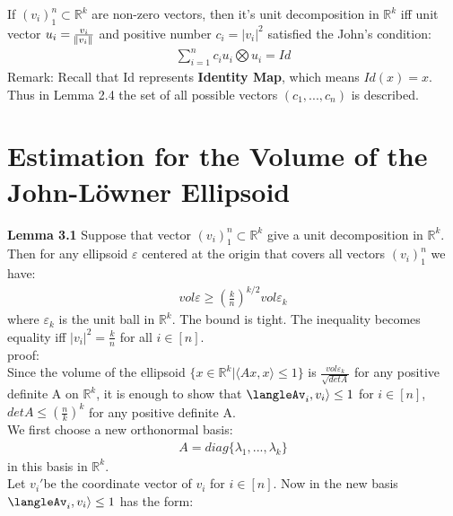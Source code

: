 \documentclass[fontsize=12pt,a4paper]{article}
\begin{document}
If $(v_i)^n_1 \subset \mathbb{R}^k$ are non-zero vectors, then it's unit decomposition in $\mathbb{R}^k$ iff unit vector $u_i = \frac{v_i}{\norm{v_i}}$ and positive number $c_i = |v_i|^2$ satisfied the John's condition:\\
\begin{align}
     \sum_{i=1}^n c_i u_i \bigotimes u_i = Id
\end{align}
Remark: Recall that Id represents \textbf{Identity Map}, which means $Id(x) = x$.\\


Thus in Lemma 2.4 the set of all possible vectors $(c_1,...,c_n)$ is described.



\section{Estimation for the Volume of the John-Löwner Ellipsoid}

\textbf{Lemma 3.1} Suppose that vector $(v_i)^n_1 \subset \mathbb{R}^k$ give a unit decomposition in $\mathbb{R}^k$.\\
Then for any ellipsoid $\varepsilon$ centered at the origin that covers all vectors $(v_i)^n_1$ we have:\\
\begin{align}
    vol \varepsilon \geq (\frac{k}{n})^{k/2}vol \varepsilon_k
\end{align}
where $\varepsilon_k$ is the unit ball in $\mathbb{R}^k$. The bound is tight. The inequality becomes equality iff $|v_i|^2 = \frac{k}{n}$ for all $ i\in [n]$.\\

proof:\\
Since the volume of the ellipsoid $\{x \in \mathbb{R}^k|\langle Ax,x \rangle \leq 1\}$ is $\frac{vol\varepsilon_k}{\sqrt{det A}}$ for any positive definite A on $\mathbb{R}^k$, it is enough to show that $\langleAv_i,v_i\rangle \leq 1$ for $i \in [n]$, $det A \leq (\frac{n}{k})^k$ for any positive definite A.\\
We first choose a new orthonormal basis:\\

\begin{align}
   A = diag\{\lambda_1,...,\lambda_k\}
\end{align}
in this basis in $\mathbb{R}^k$.\\
Let $v_i'$be the coordinate vector of $v_i$ for $i \in [n]$. Now in the new basis $\langleAv_i,v_i\rangle \leq 1$ has the form:\\
\end{document}
